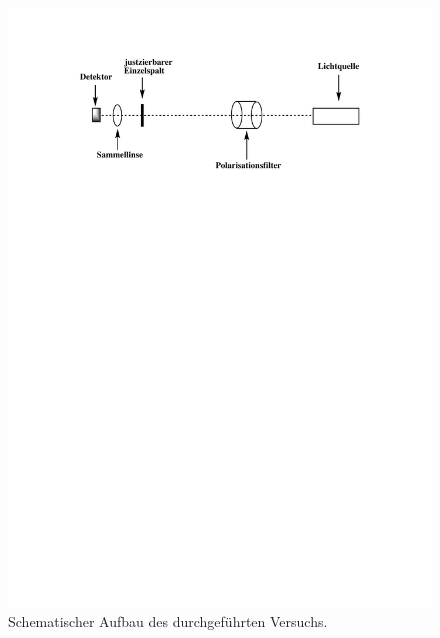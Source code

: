 \begin{figure}[H]
	\centering	
	\begin{minipage}{1\textwidth}
		\includegraphics[width=\columnwidth]{Bilder/Versuchsaufbau.pdf}
	\end{minipage}
	\caption{Schematischer Aufbau des durchgeführten Versuchs.}
	\label{Versuchsaufbau}
\end{figure} 
%
